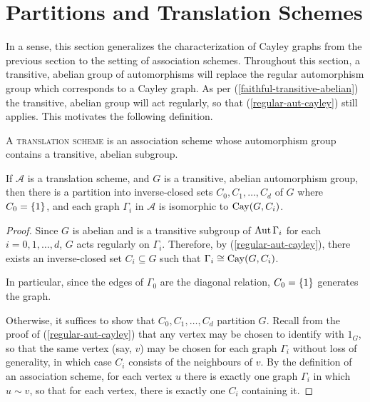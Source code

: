 \documentclass{report}
\newcommand{\AS}{\mathcal{A}}
\begin{document}
  \section{Partitions and Translation Schemes}

    In a sense, this section generalizes the characterization of Cayley graphs
    from the previous section to the setting of association schemes.
    Throughout this section, a transitive, abelian group of automorphisms will
    replace the regular automorphism group which corresponds to a Cayley graph.
    As per (\ref{faithful-transitive-abelian}) the transitive, abelian group
    will act regularly, so that (\ref{regular-aut-cayley}) still applies.
    This motivates the following definition.

    \begin{defn}\label{translation-scheme}
      A \textsc{translation scheme} is an association scheme whose
      automorphism group contains a transitive, abelian subgroup.
    \end{defn}

    \begin{lem}\label{translation-partition}
      If $\AS$ is a translation scheme,
      and $G$ is a transitive, abelian automorphism group,
      then there is a partition into inverse-closed sets
      $C_0, C_1, \ldots, C_d$ of $G$ where $C_0 = \left\lbrace 1 \right\rbrace$,
      and each graph $\Gamma_i$ in $\AS$ is isomorphic to $\operatorname{Cay}(G, C_i)$.
    \end{lem}

    \begin{proof}
      Since $G$ is abelian and is a transitive subgroup of $\operatorname{Aut} \Gamma_i$ for
      each $i = 0, 1, \ldots, d$, $G$ acts regularly on $\Gamma_i$.
      Therefore, by (\ref{regular-aut-cayley}), there exists an inverse-closed
      set $C_i \subseteq G$ such that $\Gamma_i \cong \operatorname{Cay}(G, C_i)$.

      In particular, since the edges of $\Gamma_0$ are the diagonal relation,
      $C_0 = \left\lbrace 1 \right\rbrace$ generates the graph.

      Otherwise, it suffices to show that $C_0, C_1, \ldots, C_d$ partition $G$.
      Recall from the proof of (\ref{regular-aut-cayley}) that any vertex may be
      chosen to identify with $1_G$, so that the same vertex (say, $v$)
      may be chosen for each graph $\Gamma_i$ without loss of generality,
      in which case $C_i$ consists of the neighbours of $v$.  By the definition
      of an association scheme, for each vertex $u$ there is exactly one
      graph $\Gamma_i$ in which $u \sim v$, so that for each vertex, there is
      exactly one $C_i$ containing it.
    \end{proof}
\end{document}
